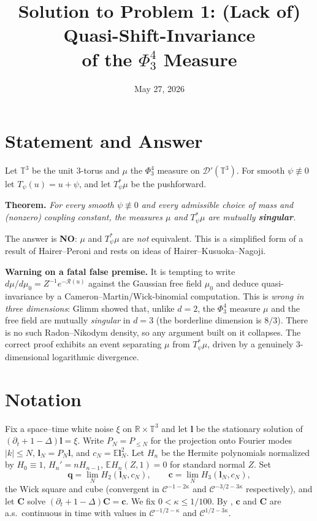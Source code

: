 \documentclass[11pt]{article}
\title{Solution to Problem 1: (Lack of) Quasi-Shift-Invariance\\
of the $\Phi^4_3$ Measure}
\author{}
\date{May 27, 2026}
\newcommand{\T}{\mathbb{T}}
\newcommand{\R}{\mathbb{R}}
\newcommand{\C}{\mathcal{C}}
\newcommand{\D}{\mathcal{D}}
\newcommand{\E}{\mathbb{E}}
\newcommand{\Hp}{H}      %
\newcommand{\PN}{P_N}
\newcommand{\Lin}{\mathbf{l}}   %
\newcommand{\Lsq}{\mathbf{q}}   %
\newcommand{\Lcb}{\mathbf{c}}   %
\newcommand{\Iqc}{\mathbf{C}}   %
\begin{document}
\maketitle

\section*{Statement and Answer}

Let $\T^3$ be the unit $3$-torus and $\mu$ the $\Phi^4_3$ measure on
$\D'(\T^3)$. For smooth $\psi\not\equiv0$ let $T_\psi(u)=u+\psi$, and let
$T_\psi^*\mu$ be the pushforward.

\medskip
\noindent\textbf{Theorem.} \emph{For every smooth $\psi\not\equiv0$ and every
admissible choice of mass and (nonzero) coupling constant, the measures $\mu$ and
$T_\psi^*\mu$ are mutually \textbf{singular}.}

\medskip
\noindent The answer is \textbf{NO}: $\mu$ and $T_\psi^*\mu$ are \emph{not}
equivalent. This is a simplified form of a result of Hairer--Peroni and rests on
ideas of Hairer--Kusuoka--Nagoji.

\medskip
\noindent\textbf{Warning on a fatal false premise.} It is tempting to write
$d\mu/d\mu_0=Z^{-1}e^{-\mathcal R(u)}$ against the Gaussian free field $\mu_0$
and deduce quasi-invariance by a Cameron--Martin/Wick-binomial computation. This
is \emph{wrong in three dimensions}: Glimm showed that, unlike $d=2$, the
$\Phi^4_3$ measure $\mu$ and the free field are mutually \emph{singular} in
$d=3$ (the borderline dimension is $8/3$). There is no such Radon--Nikodym
density, so any argument built on it collapses. The correct proof exhibits an
event separating $\mu$ from $T_\psi^*\mu$, driven by a genuinely
$3$-dimensional logarithmic divergence.

\section*{Notation}

Fix a space--time white noise $\xi$ on $\R\times\T^3$ and let $\Lin$ be the
stationary solution of $(\partial_t+1-\Delta)\Lin=\xi$. Write $\PN=P_{\le N}$ for
the projection onto Fourier modes $|k|\le N$, $\Lin_N=\PN\Lin$, and
$c_N=\E\Lin_N^2$. Let $\Hp_n$ be the Hermite polynomials normalized by
$\Hp_0\equiv1$, $\Hp_n'=n\Hp_{n-1}$, $\E\Hp_n(Z,1)=0$ for standard normal $Z$. Set
\[
\Lsq=\lim_{N}\Hp_2(\Lin_N,c_N),\qquad \Lcb=\lim_N\Hp_3(\Lin_N,c_N),
\]
the Wick square and cube (convergent in $\C^{-1-2\kappa}$ and $\C^{-3/2-3\kappa}$
respectively), and let $\Iqc$ solve $(\partial_t+1-\Delta)\Iqc=\Lcb$. We fix
$0<\kappa\le 1/100$. By \cite{HKN24}, $\Lcb$ and $\Iqc$ are a.s.\ continuous in
time with values in $\C^{-1/2-\kappa}$ and $\C^{1/2-3\kappa}$.
\end{document}
